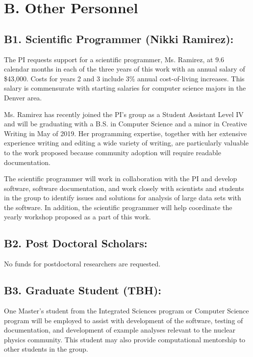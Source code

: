 \documentclass[11pt,oneside]{memoir}
\begin{document}
\section*{B. Other Personnel}

\subsection*{B1. Scientific Programmer (Nikki Ramirez):}
The PI requests support for a scientific programmer, Ms. Ramirez, at 9.6 calendar months in each of the three years of this work with an annual salary of \$43,000. Costs for years 2 and 3 include 3\% annual  cost-of-living increases.  This salary is commensurate with starting salaries for computer science majors in the Denver area.

Ms. Ramirez has recently joined the PI's group as a Student Assistant Level IV and will be graduating with a B.S. in Computer Science and a minor in Creative Writing in May of 2019.  Her programming expertise, together with her extensive experience writing and editing a wide variety of writing, are particularly valuable to the work proposed because community adoption will require readable documentation.

The scientific programmer will work in collaboration with the PI and develop software, software documentation, and work closely with scientists and students in the group to identify issues and solutions for analysis of large data sets with the software.  In addition, the scientific programmer will help coordinate the yearly workshop proposed as a part of this work.


\subsection{B2.  Post Doctoral Scholars:}

No funds for postdoctoral researchers are requested.


\subsection[B3]{B3. Graduate Student (TBH):} 
\label{sec:masters-student-salary}
One Master's student from the Integrated Sciences program or Computer Science program will be employed to assist with development of the software, testing of documentation, and development of example analyses relevant to the nuclear physics community.  This student may also provide computational mentorship to other students in the group.  
\end{document}
